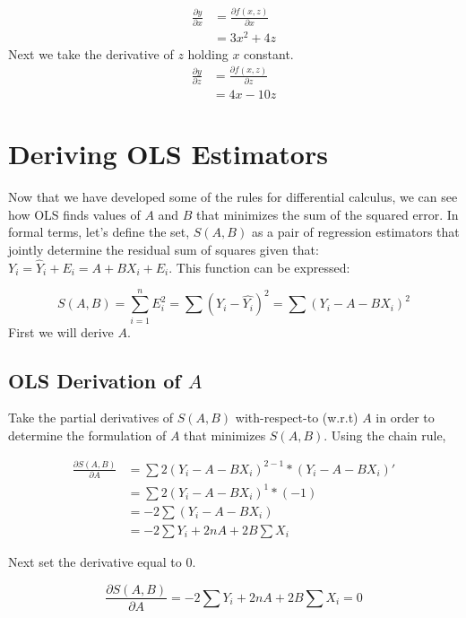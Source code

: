 \documentclass[11pt,openany]{book}\usepackage[]{graphicx}\usepackage[]{color}
\begin{document}
\begin{align*}
 \frac{\partial y}{\partial x} &= \frac{\partial f(x,z)}{\partial x} \\
 &= 3x^{2}+4z
\end{align*}
Next we take the derivative of $z$ holding $x$ constant. 
\begin{align*}
 \frac{\partial y}{\partial z} &= \frac{\partial f(x,z)}{\partial z} \\
 &= 4x-10z
\end{align*}

\section{Deriving OLS Estimators}

Now that we have developed some of the rules for differential calculus, we can see how OLS finds values of $A$ and $B$ that minimizes the sum of the squared error. In formal terms, let's define the set, $S(A,B)$ as a pair of regression estimators that jointly determine the residual sum of squares given that: $Y_{i}=\hat {Y}_{i}+E_{i}=A+BX_{i}+E_{i}$. This function can be expressed:

\begin{equation*}
 S(A,B)=\sum_{i=1}^{n} E^{2}_{i}=\sum (Y_{i}-\hat{Y_{i}})^{2}=\sum (Y_{i}-A-BX_{i})^{2}  
\end{equation*}
First we will derive $A$. 

\subsection{OLS Derivation of $A$}

Take the partial derivatives of $S(A,B)$ with-respect-to (w.r.t) $A$ in order to determine the formulation of $A$ that minimizes $S(A,B)$. Using the chain rule,

\begin{align*}
\frac{\partial S(A,B)}{\partial A} &= \sum
2(Y_{i}-A-BX_{i})^{2-1}*(Y_{i}-A-BX_{i})' \\
&= \sum 2(Y_{i}-A-BX_{i})^{1}*(-1) \\
&= -2 \sum (Y_{i}-A-BX_{i}) \\ 
&= -2 \sum Y_{i}+2nA+2B \sum X_{i} 
\end{align*}

\noindent Next set the derivative equal to $0$. 

\begin{equation*}
\frac{\partial S(A,B)}{\partial A} =  -2 \sum Y_{i}+2nA+2B \sum X_{i} = 0 
\end{equation*}
\end{document}
